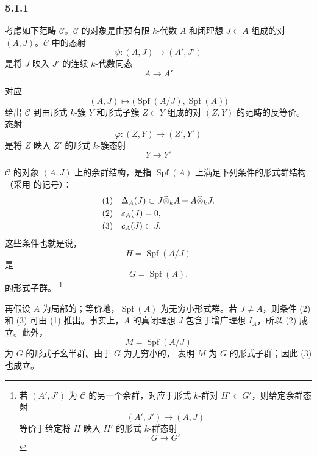 
\subsubsection*{5.1.1}
\label{sga3:VIIB:5.1.1}

考虑如下范畴 \(\mathcal C\)。\(\mathcal C\) 的对象是由预有限 \(k\)-代数 \(A\) 和闭理想 \(J\subset A\) 组成的对 \((A,J)\)。\(\mathcal C\) 中的态射
\[
  \psi:(A,J)\longrightarrow(A',J')
\]
是将 \(J\) 映入 \(J'\) 的连续 \(k\)-代数同态
\[
  A\longrightarrow A'
\]

对应
\[
  (A,J)
  \longmapsto
  \bigl(\operatorname{Spf}(A/J),\operatorname{Spf}(A)\bigr)
\]
给出 \(\mathcal C\) 到由形式 \(k\)-簇 \(Y\) 和形式子簇 \(Z\subset Y\) 组成的对 \((Z,Y)\) 的范畴的反等价。态射
\[
  \varphi:(Z,Y)\longrightarrow(Z',Y')
\]
是将 \(Z\) 映入 \(Z'\) 的形式 \(k\)-簇态射
\[
  Y\longrightarrow Y'
\]

\(\mathcal C\) 的对象 \((A,J)\) 上的余群结构，是指 \(\operatorname{Spf}(A)\) 上满足下列条件的形式群结构\textup{（采用  的记号）}：
\[
\begin{aligned}
  \textup{(1)}\quad&
  \Delta_A(J)
  \subset
  J\widehat\otimes_kA
  +
  A\widehat\otimes_kJ,
  \\
  \textup{(2)}\quad&
  \varepsilon_A(J)=0,
  \\
  \textup{(3)}\quad&
  c_A(J)\subset J.
\end{aligned}
\]
这些条件也就是说，
\[
  H=\operatorname{Spf}(A/J)
\]
是
\[
  G=\operatorname{Spf}(A).
\]
的形式子群。
\footnote{\label{sga3:VIIB:nde:145}若 \((A',J')\) 为 \(\mathcal C\) 的另一个余群，对应于形式 \(k\)-群对 \(H'\subset G'\)，则给定余群态射
\[
  (A',J')\longrightarrow(A,J)
\]
等价于给定将 \(H\) 映入 \(H'\) 的形式 \(k\)-群态射
\[
  G\longrightarrow G'
\]}

再假设 \(A\) 为局部的；等价地，\(\operatorname{Spf}(A)\) 为无穷小形式群。若 \(J\ne A\)，则条件 \textup{(2)} 和 \textup{(3)} 可由 \textup{(1)} 推出。事实上，\(A\) 的真闭理想 \(J\) 包含于增广理想 \(I_A\)，所以 \textup{(2)} 成立。此外，
\[
  M=\operatorname{Spf}(A/J)
\]
为 \(G\) 的形式子幺半群。由于 \(G\) 为无穷小的， 表明 \(M\) 为 \(G\) 的形式子群；因此 \textup{(3)} 也成立。
